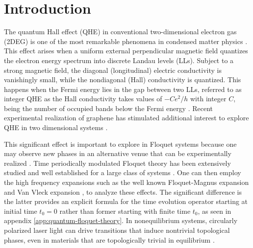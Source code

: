 \section{Introduction}

The quantum Hall effect (QHE) in conventional two-dimensional electron gas (2DEG) is one of the most remarkable phenomena in condensed matter physics \cite{QHE1}.
This effect arises when a uniform external perpendicular magnetic field quantizes the electron energy spectrum into discrete Landau levels (LLs).
Subject to a strong magnetic field, the diagonal (longitudinal) electric conductivity is vanishingly small, while the nondiagonal (Hall) conductivity is quantized.
This happens when the Fermi energy lies in the gap between two LLs, referred to as integer QHE as the Hall conductivity takes values of $-Ce^2/h$ with integer $C$, being the number of occupied bands below the Fermi energy \cite{QHE4}.
Recent experimental realization of graphene has stimulated additional interest to explore QHE in two dimensional systems \cite{QHE2, QHE3, QHE4}.

This significant effect is important to explore in Floquet systems \cite{NHL, AEE} because one may observe new phases in an alternative venue that can be experimentally realized \cite{MCR, YHW, HZJ, JWM,merboldtObservationFloquetStates2024, choiDirectObservationFloquetBloch2024}.
Time periodically modulated Floquet theory has been extensively studied and well established for a large class of systems \cite{JHS,HSA,MGP,MBL,AEE,NGJ}.
One can then employ the high frequency expansions \cite{MBL,AEE,NGJ,SRI,API,TMS,ESM,TKT,ALA} such as the well known Floquet-Magnus expansion \cite{ESM,TKT,ALA,FCA} and Van Vleck expansion \cite{MBL,AEE}, to analyze these effects.
The significant difference is the latter provides an explicit formula for the time evolution operator starting at initial time $t_{0}=0$ rather than former starting with finite time $t_{0}$, as seen in appendix \ref{app:quantum-floquet-theory}.
In nonequilibrium systems, circularly polarized laser light can drive transitions that induce nontrivial topological phases, even in materials that are topologically trivial in equilibrium \cite{TKO}.

